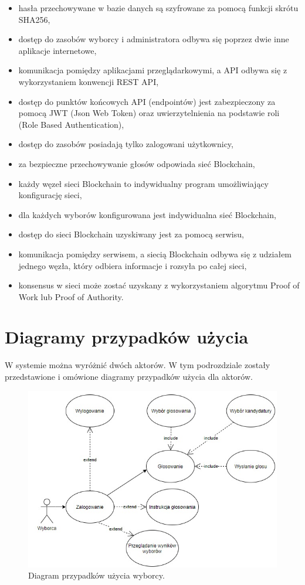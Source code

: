 \documentclass[a4paper,12pt]{book}
\begin{document}
\begin{itemize}
	\item hasła przechowywane w bazie danych są szyfrowane za pomocą funkcji skrótu SHA256,
	\item dostęp do zasobów wyborcy i administratora odbywa się poprzez dwie inne aplikacje internetowe,
	\item komunikacja pomiędzy aplikacjami przeglądarkowymi, a API odbywa się z wykorzystaniem konwencji REST API,
	\item dostęp do punktów końcowych API (endpointów) jest zabezpieczony za pomocą JWT (Json Web Token) oraz uwierzytelnienia na podstawie roli (Role Based Authentication),
	\item dostęp do zasobów posiadają tylko zalogowani użytkownicy,
	\item za bezpieczne przechowywanie głosów odpowiada sieć Blockchain,
	\item każdy węzeł sieci Blockchain to indywidualny program umożliwiający konfigurację sieci,
	\item dla każdych wyborów konfigurowana jest indywidualna sieć Blockchain,
	\item dostęp do sieci Blockchain uzyskiwany jest za pomocą serwisu,
	\item komunikacja pomiędzy serwisem, a siecią Blockchain odbywa się z udziałem jednego węzła, który odbiera informacje i rozsyła po całej sieci,
	\item konsensus w sieci może zostać uzyskany z wykorzystaniem algorytmu Proof of Work lub Proof of Authority.
\end{itemize}

\newpage

\section{Diagramy przypadków użycia}

W systemie można wyróżnić dwóch aktorów. W tym podrozdziale zostały przedstawione i omówione diagramy przypadków użycia dla aktorów.

\begin{figure}[h]
	\centering
	\includegraphics[width=\textwidth]{images/user_use_case.jpg}
	\caption{Diagram przypadków użycia wyborcy.}\label{user-use}
\end {figure}
\end{document}
